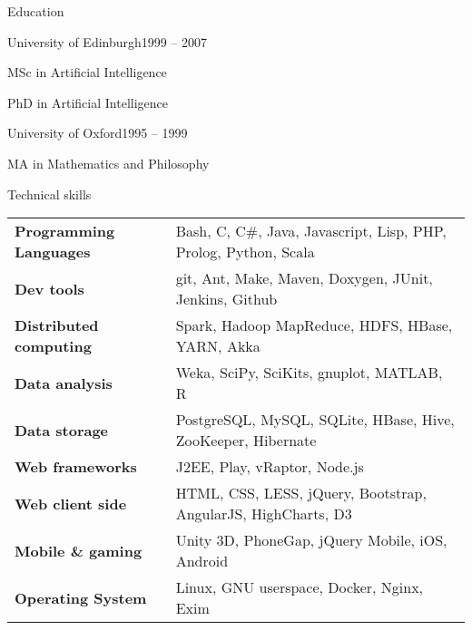 \documentclass{resume} %
\begin{document}

\begin{rSection}{Education}
\begin{rSubsection}{University of Edinburgh}{1999 -- 2007}{}{}
\item MSc in Artificial Intelligence
\item PhD in Artificial Intelligence
\end{rSubsection}

\begin{rSubsection}{University of Oxford}{1995 -- 1999}{}{}
\item MA in Mathematics and Philosophy
\end{rSubsection}
\end{rSection}


\begin{rSection}{Technical skills}

\begin{tabular}{ @{} >{\bfseries}l @{\hspace{6ex}} l }
Programming Languages & Bash, C, C\#, Java, Javascript, Lisp, PHP, Prolog, Python, Scala \\
Dev tools & git, Ant, Make, Maven, Doxygen, JUnit, Jenkins, Github \\
Distributed computing & Spark, Hadoop MapReduce, HDFS, HBase, YARN, Akka \\
Data analysis & Weka, SciPy, SciKits, gnuplot, MATLAB, R \\
Data storage & PostgreSQL, MySQL, SQLite, HBase, Hive, ZooKeeper, Hibernate	\\
Web frameworks & J2EE, Play, vRaptor, Node.js \\
Web client side & HTML, CSS, LESS, jQuery, Bootstrap, AngularJS, HighCharts, D3 \\
Mobile \& gaming & Unity 3D, PhoneGap, jQuery Mobile, iOS, Android \\
Operating System & Linux, GNU userspace, Docker, Nginx, Exim \\
\end{tabular}

\end{rSection}
\end{document}
